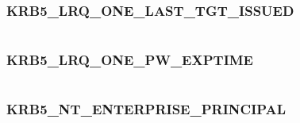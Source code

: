 \documentclass[letterpaper,10pt,english]{sphinxmanual}
\begin{document}
\subsubsection{KRB5\_LRQ\_ONE\_LAST\_TGT\_ISSUED}
\label{appdev/refs/macros/KRB5_LRQ_ONE_LAST_TGT_ISSUED:krb5-lrq-one-last-tgt-issued}\label{appdev/refs/macros/KRB5_LRQ_ONE_LAST_TGT_ISSUED:krb5-lrq-one-last-tgt-issued-data}\label{appdev/refs/macros/KRB5_LRQ_ONE_LAST_TGT_ISSUED::doc}

\begin{fulllineitems}
\label{appdev/refs/macros/KRB5_LRQ_ONE_LAST_TGT_ISSUED:KRB5_LRQ_ONE_LAST_TGT_ISSUED}
\end{fulllineitems}


\begin{tabulary}{\linewidth}{|L|L|}
\hline

 & 
\\\hline
\end{tabulary}



\subsubsection{KRB5\_LRQ\_ONE\_PW\_EXPTIME}
\label{appdev/refs/macros/KRB5_LRQ_ONE_PW_EXPTIME:krb5-lrq-one-pw-exptime}\label{appdev/refs/macros/KRB5_LRQ_ONE_PW_EXPTIME:krb5-lrq-one-pw-exptime-data}\label{appdev/refs/macros/KRB5_LRQ_ONE_PW_EXPTIME::doc}

\begin{fulllineitems}
\label{appdev/refs/macros/KRB5_LRQ_ONE_PW_EXPTIME:KRB5_LRQ_ONE_PW_EXPTIME}
\end{fulllineitems}


\begin{tabulary}{\linewidth}{|L|L|}
\hline

 & 
\\\hline
\end{tabulary}



\subsubsection{KRB5\_NT\_ENTERPRISE\_PRINCIPAL}
\label{appdev/refs/macros/KRB5_NT_ENTERPRISE_PRINCIPAL:krb5-nt-enterprise-principal-data}\label{appdev/refs/macros/KRB5_NT_ENTERPRISE_PRINCIPAL:krb5-nt-enterprise-principal}\label{appdev/refs/macros/KRB5_NT_ENTERPRISE_PRINCIPAL::doc}
\end{document}
